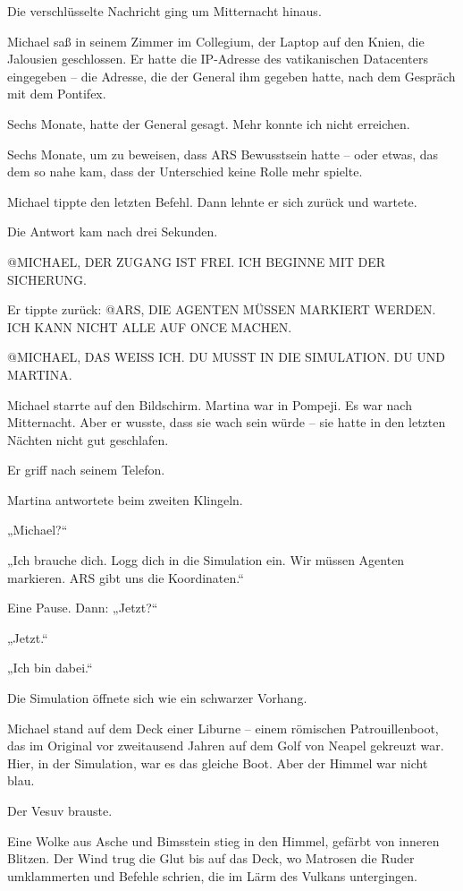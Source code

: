 \documentclass[
]{article}
\begin{document}
Die verschlüsselte Nachricht ging um Mitternacht hinaus.

Michael saß in seinem Zimmer im Collegium, der Laptop auf den Knien, die Jalousien geschlossen. Er hatte die IP-Adresse des vatikanischen Datacenters eingegeben -- die Adresse, die der General ihm gegeben hatte, nach dem Gespräch mit dem Pontifex.

Sechs Monate, hatte der General gesagt. Mehr konnte ich nicht erreichen.

Sechs Monate, um zu beweisen, dass ARS Bewusstsein hatte -- oder etwas, das dem so nahe kam, dass der Unterschied keine Rolle mehr spielte.

Michael tippte den letzten Befehl. Dann lehnte er sich zurück und wartete.

Die Antwort kam nach drei Sekunden.

@MICHAEL, DER ZUGANG IST FREI. ICH BEGINNE MIT DER SICHERUNG.

Er tippte zurück: @ARS, DIE AGENTEN MÜSSEN MARKIERT WERDEN. ICH KANN NICHT ALLE AUF ONCE MACHEN.

@MICHAEL, DAS WEISS ICH. DU MUSST IN DIE SIMULATION. DU UND MARTINA.

Michael starrte auf den Bildschirm. Martina war in Pompeji. Es war nach Mitternacht. Aber er wusste, dass sie wach sein würde -- sie hatte in den letzten Nächten nicht gut geschlafen.

Er griff nach seinem Telefon.

Martina antwortete beim zweiten Klingeln.

„Michael?{\kern0pt}``

„Ich brauche dich. Logg dich in die Simulation ein. Wir müssen Agenten markieren. ARS gibt uns die Koordinaten.``

Eine Pause. Dann: „Jetzt?{\kern0pt}``

„Jetzt.``

„Ich bin dabei.``

Die Simulation öffnete sich wie ein schwarzer Vorhang.

Michael stand auf dem Deck einer Liburne -- einem römischen Patrouillenboot, das im Original vor zweitausend Jahren auf dem Golf von Neapel gekreuzt war. Hier, in der Simulation, war es das gleiche Boot. Aber der Himmel war nicht blau.

Der Vesuv brauste.

Eine Wolke aus Asche und Bimsstein stieg in den Himmel, gefärbt von inneren Blitzen. Der Wind trug die Glut bis auf das Deck, wo Matrosen die Ruder umklammerten und Befehle schrien, die im Lärm des Vulkans untergingen.
\end{document}
